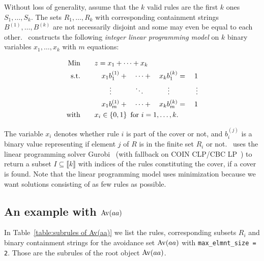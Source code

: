 Without loss of generality, assume that the $k$ valid rules are the first $k$ 
ones $S_1, \ldots, S_k$. The sets $R_1, \ldots, R_k$ with corresponding 
containment strings $B^{(1)}, \ldots, B^{(k)}$ are not necessarily disjoint and 
some may even be equal to each other. \CombCov\ constructs the following 
\emph{integer linear programming model} on $k$ binary variables $x_1, \ldots, x_k$
with $m$ equations:

\begin{alignat*}{5}
    \text{Min}  \qquad  & \mathrlap{z = x_1 + \dotsb + x_k}   & & & & & & & \\
    \text{s.t.} \qquad  & &                             x_1 b^{(1)}_{1}         & +{} & \dotsb & +{} &                             x_k b^{(k)}_{1}             & ={} & 1      \\
                        & & \mathrel{\makebox[\widthof{$x_1 b^{(1)}_{j}$}]{\vdots}} & & \ddots &     & \mathrel{\makebox[\widthof{$x_1 b^{(k)}_{j}$}]{\vdots}} &     & \vdots \\
                        & &                             x_1 b^{(1)}_{m}         & +{} & \dotsb & +{} &                             x_k b^{(k)}_{m}             & ={} & 1      \\
    \text{with} \qquad  & \mathrlap{x_i \in \left\{ 0, 1 \right\} \text{ for } i = 1, \dotsc, k.} & & & & & & &
\end{alignat*}

The variable $x_i$ denotes whether rule $i$ is part of the cover or not, and 
$b^{(j)}_{i}$ is a binary value representing if element $j$ of $R$ is in the 
finite set $R_i$ or not. \CombCov\ uses the linear programming solver 
Gurobi~\cite{lcc_gurobi_optimization_gurobi_2019} (with fallback on COIN 
CLP/CBC LP~\cite{coin-or_coin_2019}) to return a subset $I \subseteq 
\llbracket k \rrbracket$ with indices of the rules constituting the cover, 
if a cover is found. Note that the linear programming model uses minimization 
because we want solutions consisting of as few rules as possible.


\subsection{An example with ${\mathrm{Av}\!\left(aa\right)}$}

In Table~\ref{table:subrules of Av(aa)} we list the rules, corresponding subsets 
$R_i$ and binary containment strings for the avoidance set ${\mathrm{Av}\!\left(aa\right)}$ with 
\texttt{max\_elmnt\_size = 2}. Those are the subrules of the root object 
${\mathrm{Av}\!\left(aa\right)}$.

